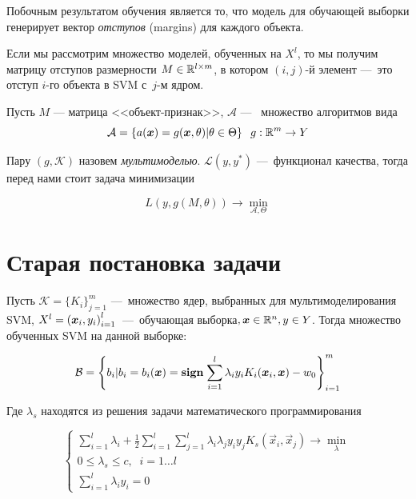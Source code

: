 \documentclass[12pt,twoside]{article}
\renewcommand{\L}{\mathcal{L}}
\begin{document}
Побочным результатом обучения является то, что модель для обучающей выборки генерирует вектор \emph{отступов} (margins) для каждого объекта.

Если мы рассмотрим множество моделей, обученных на $X^l$, то мы получим матрицу отступов  размерности
$M \in \R^{l\times m}$,
в котором $(i, j)$-й элемент ---~это отступ $i$-го объекта в SVM с~$j$-м ядром.

Пусть $M$ --- матрица <<объект-признак>>, $\mathcal{A}$ ---~ множество алгоритмов
вида
\begin{equation}
    \mathcal{A} = \left\{a(\boldsymbol{x}) = g(\boldsymbol{x}, \theta)|\theta \in \Theta\right\}\;\; g:\mathbb{R}^m \to Y
\end{equation}

Пару $(g, \mathcal{K})$ назовем \emph{мультимоделью}.
$\L(y, y^*)$ ---~функционал качества, тогда перед нами стоит задача минимизации

\begin{equation}
    L(y, g(M, \theta)) \to \min_{\mathcal{A}, \Theta}
\end{equation}


\section{Старая постановка задачи}



Пусть $\mathcal{K} = \{K_i\}_{j=1}^m$ ---~множество ядер, выбранных для
мультимоделирования SVM, $X^l = \left(\boldsymbol{x}_i, y_i\right)_{i=1}^l$~---~обучающая выборка$, \boldsymbol{x}\in \mathbb{R}^n, y \in Y$. Тогда множество обученных SVM на данной выборке:

\begin{equation}
    \mathcal{B} = \left\{b_i| b_i = b_i(\boldsymbol{x}) = \mathbf{sign}\;{\sum_{i=1}^l\lambda_i y_i K_i(\boldsymbol{x}_i, \boldsymbol{x}) - w_0}\right\}_{i=1}^m
\end{equation}

Где $\lambda_s$ находятся из решения задачи математического программирования

\begin{equation*}
 \begin{cases}
   \sum_{i=1}^l \lambda_i + \frac{1}{2}\sum_{i=1}^{l}\sum_{j=1}^{l}
    \lambda_i \lambda_j y_i y_j K_s(\vec{x}_i, \vec{x}_j) \to \min_\lambda
   \\
   0 \leq \lambda_s \leq c, \;\; i = 1\ldots l
   \\
   \sum_{i=1}^l\lambda_i y_i = 0
 \end{cases}
\end{equation*}
\end{document}
